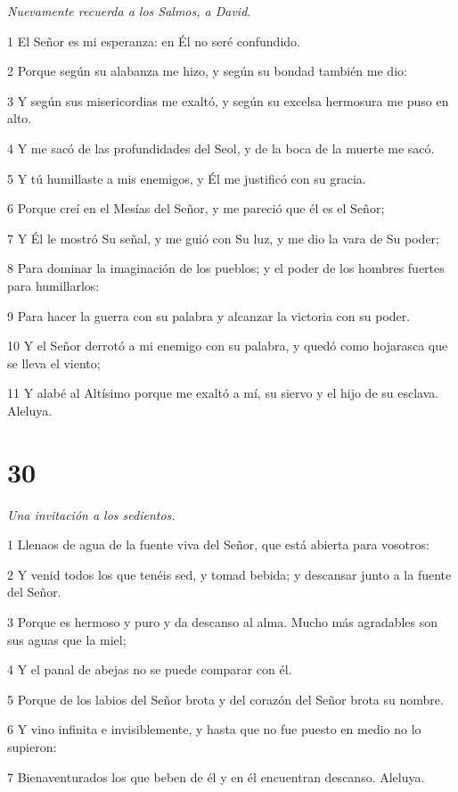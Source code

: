 \par \textit{Nuevamente recuerda a los Salmos, a David.}

\par 1 El Señor es mi esperanza: en Él no seré confundido.
\par 2 Porque según su alabanza me hizo, y según su bondad también me dio:
\par 3 Y según sus misericordias me exaltó, y según su excelsa hermosura me puso en alto.
\par 4 Y me sacó de las profundidades del Seol, y de la boca de la muerte me sacó.
\par 5 Y tú humillaste a mis enemigos, y Él me justificó con su gracia.
\par 6 Porque creí en el Mesías del Señor, y me pareció que él es el Señor;
\par 7 Y Él le mostró Su señal, y me guió con Su luz, y me dio la vara de Su poder;
\par 8 Para dominar la imaginación de los pueblos; y el poder de los hombres fuertes para humillarlos:
\par 9 Para hacer la guerra con su palabra y alcanzar la victoria con su poder.
\par 10 Y el Señor derrotó a mi enemigo con su palabra, y quedó como hojarasca que se lleva el viento;
\par 11 Y alabé al Altísimo porque me exaltó a mí, su siervo y el hijo de su esclava. Aleluya.

\chapter{30}

\par \textit{Una invitación a los sedientos.}

\par 1 Llenaos de agua de la fuente viva del Señor, que está abierta para vosotros:
\par 2 Y venid todos los que tenéis sed, y tomad bebida; y descansar junto a la fuente del Señor.
\par 3 Porque es hermoso y puro y da descanso al alma. Mucho más agradables son sus aguas que la miel;
\par 4 Y el panal de abejas no se puede comparar con él.
\par 5 Porque de los labios del Señor brota y del corazón del Señor brota su nombre.
\par 6 Y vino infinita e invisiblemente, y hasta que no fue puesto en medio no lo supieron:
\par 7 Bienaventurados los que beben de él y en él encuentran descanso. Aleluya.


